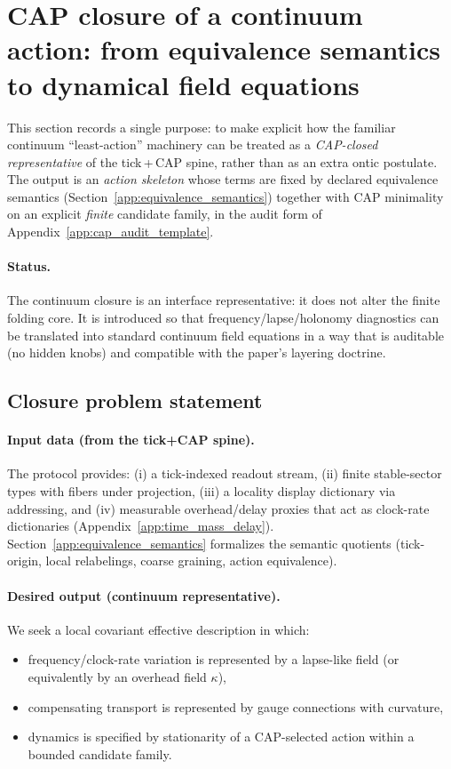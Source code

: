 \section{CAP closure of a continuum action: from equivalence semantics to dynamical field equations}
\label{app:cap_continuum_action_closure}

This section records a single purpose: to make explicit how the familiar continuum ``least-action'' machinery can be treated as a \emph{CAP-closed representative} of the tick\,+\,CAP spine, rather than as an extra ontic postulate.
The output is an \emph{action skeleton} whose terms are fixed by declared equivalence semantics (Section~\ref{app:equivalence_semantics}) together with CAP minimality on an explicit \emph{finite} candidate family, in the audit form of Appendix~\ref{app:cap_audit_template}.

\paragraph{Status.}
\InterfaceTag The continuum closure is an interface representative: it does not alter the finite folding core.
It is introduced so that frequency/lapse/holonomy diagnostics can be translated into standard continuum field equations in a way that is auditable (no hidden knobs) and compatible with the paper's layering doctrine.

\subsection{Closure problem statement}
\label{subsec:cap_continuum_closure_problem}

\paragraph{Input data (from the tick+CAP spine).}
\InterfaceTag The protocol provides: (i) a tick-indexed readout stream, (ii) finite stable-sector types with fibers under projection, (iii) a locality display dictionary via addressing, and (iv) measurable overhead/delay proxies that act as clock-rate dictionaries (Appendix~\ref{app:time_mass_delay}).
Section~\ref{app:equivalence_semantics} formalizes the semantic quotients (tick-origin, local relabelings, coarse graining, action equivalence).

\paragraph{Desired output (continuum representative).}
\InterfaceTag We seek a local covariant effective description in which:
\begin{itemize}
\item frequency/clock-rate variation is represented by a lapse-like field (or equivalently by an overhead field $\kappa$),
\item compensating transport is represented by gauge connections with curvature,
\item dynamics is specified by stationarity of a CAP-selected action within a bounded candidate family.
\end{itemize}

